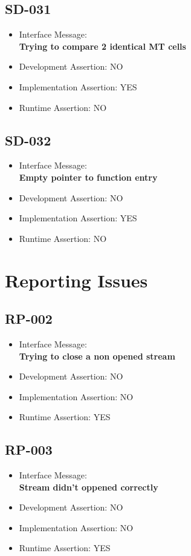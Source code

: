 \subsection{SD-031}
\begin{itemize}
  \item Interface Message:\\[1em]\textbf{Trying to compare 2 identical MT cells}
  \item Development Assertion: NO
  \item Implementation Assertion: YES
  \item Runtime Assertion: NO
\end{itemize}

\subsection{SD-032}
\begin{itemize}
  \item Interface Message:\\[1em]\textbf{Empty pointer to function entry}
  \item Development Assertion: NO
  \item Implementation Assertion: YES
  \item Runtime Assertion: NO
\end{itemize}

\section{Reporting Issues}

\subsection{RP-002}
\begin{itemize}
  \item Interface Message:\\[1em]\textbf{Trying to close a non opened stream}
  \item Development Assertion: NO
  \item Implementation Assertion: NO
  \item Runtime Assertion: YES
\end{itemize}

\subsection{RP-003}
\begin{itemize}
  \item Interface Message:\\[1em]\textbf{Stream didn't oppened correctly}
  \item Development Assertion: NO
  \item Implementation Assertion: NO
  \item Runtime Assertion: YES
\end{itemize}

